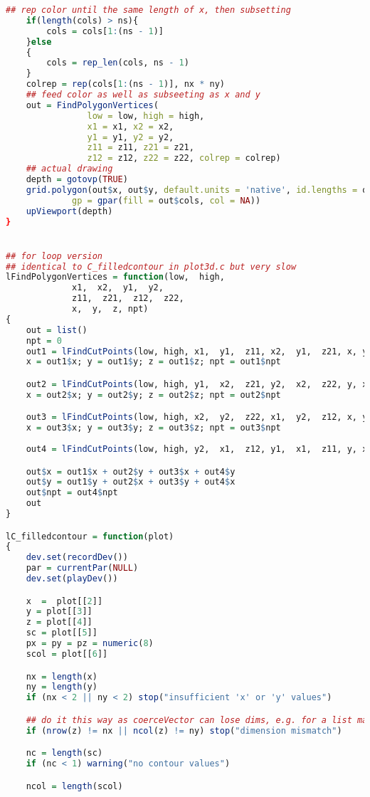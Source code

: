 \begin{lstlisting}[language = R]
    ## rep color until the same length of x, then subsetting 
    if(length(cols) > ns){
        cols = cols[1:(ns - 1)]
    }else
    {
        cols = rep_len(cols, ns - 1)
    }
    colrep = rep(cols[1:(ns - 1)], nx * ny)
    ## feed color as well as subseeting as x and y
    out = FindPolygonVertices(
                low = low, high = high,
                x1 = x1, x2 = x2, 
                y1 = y1, y2 = y2,
                z11 = z11, z21 = z21, 
                z12 = z12, z22 = z22, colrep = colrep)
    ## actual drawing
    depth = gotovp(TRUE)
    grid.polygon(out$x, out$y, default.units = 'native', id.lengths = out$id.length,
             gp = gpar(fill = out$cols, col = NA))
    upViewport(depth)
}


## for loop version
## identical to C_filledcontour in plot3d.c but very slow
lFindPolygonVertices = function(low,  high,
		     x1,  x2,  y1,  y2,
		     z11,  z21,  z12,  z22,
		     x,  y,  z, npt)
{
    out = list()
    npt = 0
    out1 = lFindCutPoints(low, high, x1,  y1,  z11, x2,  y1,  z21, x, y, z, npt)
    x = out1$x; y = out1$y; z = out1$z; npt = out1$npt

    out2 = lFindCutPoints(low, high, y1,  x2,  z21, y2,  x2,  z22, y, x, z, npt)
    x = out2$x; y = out2$y; z = out2$z; npt = out2$npt

    out3 = lFindCutPoints(low, high, x2,  y2,  z22, x1,  y2,  z12, x, y, z, npt)
    x = out3$x; y = out3$y; z = out3$z; npt = out3$npt
            
    out4 = lFindCutPoints(low, high, y2,  x1,  z12, y1,  x1,  z11, y, x, z, npt)

    out$x = out1$x + out2$y + out3$x + out4$y
    out$y = out1$y + out2$x + out3$y + out4$x
    out$npt = out4$npt
    out
}

lC_filledcontour = function(plot)
{
    dev.set(recordDev())
    par = currentPar(NULL)
    dev.set(playDev())

    x  =  plot[[2]]
    y = plot[[3]]
    z = plot[[4]]
    sc = plot[[5]]
    px = py = pz = numeric(8)
    scol = plot[[6]]

    nx = length(x)
    ny = length(y)
    if (nx < 2 || ny < 2) stop("insufficient 'x' or 'y' values")

    ## do it this way as coerceVector can lose dims, e.g. for a list matrix
    if (nrow(z) != nx || ncol(z) != ny) stop("dimension mismatch")

    nc = length(sc)
    if (nc < 1) warning("no contour values")

    ncol = length(scol)


\end{lstlisting}
